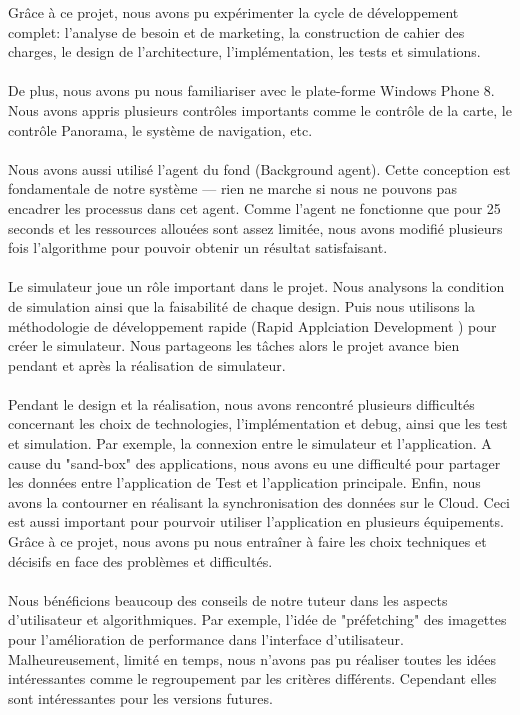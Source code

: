 \documentclass{article}
\begin{document}
Grâce à ce projet, nous avons pu expérimenter la cycle de développement complet: l'analyse de besoin et de marketing, la construction de cahier des charges, le design de l'architecture, l'implémentation, les tests et simulations. 
\\\\
De plus, nous avons pu nous familiariser avec le plate-forme Windows Phone 8. Nous avons appris plusieurs contrôles importants comme le contrôle de la carte, le contrôle Panorama, le système de navigation, etc.
\\\\
Nous avons aussi utilisé l'agent du fond (Background agent). Cette conception est fondamentale de notre système --- rien ne marche si nous ne pouvons pas encadrer les processus dans cet agent. Comme l'agent ne fonctionne que pour 25 seconds et les ressources allouées sont assez limitée, nous avons modifié plusieurs fois l'algorithme pour pouvoir obtenir un résultat satisfaisant. 
\\\\
Le simulateur joue  un rôle important dans le projet. Nous analysons la condition de simulation ainsi que la faisabilité de chaque design. Puis nous utilisons la méthodologie de développement rapide (Rapid Applciation Development ) pour créer le simulateur.  Nous partageons les tâches alors le projet avance bien pendant et après la réalisation de simulateur.
\\\\
Pendant le design et la réalisation, nous avons rencontré plusieurs difficultés concernant les choix de technologies, l'implémentation et debug, ainsi que les test et simulation. Par exemple, la connexion entre le simulateur et l'application. A cause du "sand-box" des applications, nous avons eu une difficulté pour partager les données entre l'application de Test et l'application principale. Enfin, nous avons la contourner en réalisant la synchronisation des données sur le Cloud. Ceci est aussi important pour pourvoir utiliser l'application en plusieurs équipements. Grâce à ce projet, nous avons pu nous entraîner à faire les choix techniques et décisifs en face des problèmes et difficultés.
\\\\
Nous bénéficions beaucoup des conseils de notre tuteur dans les aspects d'utilisateur et algorithmiques. Par exemple, l'idée de "préfetching"  des imagettes pour l'amélioration de performance dans l'interface d'utilisateur. Malheureusement, limité en temps, nous n'avons pas pu réaliser toutes les idées intéressantes comme le regroupement par les critères différents. Cependant elles sont intéressantes pour les versions futures.
\end{document}
